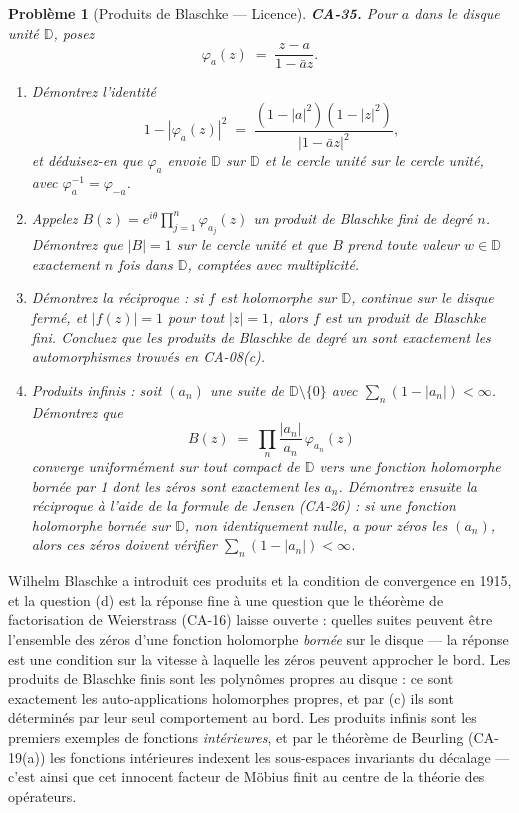 \documentclass[11pt]{article}
\newtheorem{problem}{Problème}
\begin{document}
\bigskip

\begin{problem}[{Produits de Blaschke --- Licence}]
\textbf{CA-35.} Pour $ a $ dans le disque unité $ \mathbb{D} $, posez
\[ \varphi_a(z) \;=\; \frac{z - a}{1 - \bar{a}z} . \]
\begin{enumerate}
\item[(a)] Démontrez l'identité
\[ 1 - |\varphi_a(z)|^2 \;=\; \frac{(1 - |a|^2)(1 - |z|^2)}{|1 - \bar{a}z|^2} , \]
et déduisez-en que $ \varphi_a $ envoie $ \mathbb{D} $ sur $ \mathbb{D} $ et le cercle unité
sur le cercle unité, avec $ \varphi_a^{-1} = \varphi_{-a} $.
\item[(b)] Appelez $ B(z) = e^{i\theta} \prod_{j=1}^{n} \varphi_{a_j}(z) $ un \textit{produit de Blaschke fini}
de degré $ n $. Démontrez que $ |B| = 1 $ sur le cercle unité et que $ B $ prend toute valeur
$ w \in \mathbb{D} $ exactement $ n $ fois dans $ \mathbb{D} $, comptées avec
multiplicité.
\item[(c)] Démontrez la réciproque : si $ f $ est holomorphe sur $ \mathbb{D} $, continue sur le disque
fermé, et $ |f(z)| = 1 $ pour tout $ |z| = 1 $, alors $ f $ est un produit de Blaschke fini.
Concluez que les produits de Blaschke de degré un sont exactement les automorphismes trouvés en
CA-08(c).
\item[(d)] Produits infinis : soit $ (a_n) $ une suite de $ \mathbb{D} \setminus \{0\} $ avec
$ \sum_n (1 - |a_n|) < \infty $. Démontrez que
\[ B(z) \;=\; \prod_{n} \frac{|a_n|}{a_n}\, \varphi_{a_n}(z) \]
converge uniformément sur tout compact de $ \mathbb{D} $ vers une fonction holomorphe bornée par 1
dont les zéros sont exactement les $ a_n $. Démontrez ensuite la réciproque à l'aide de la formule
de Jensen (CA-26) : si une fonction holomorphe bornée sur $ \mathbb{D} $, non identiquement nulle,
a pour zéros les $ (a_n) $, alors ces zéros doivent vérifier
$ \sum_n (1 - |a_n|) < \infty $.
\end{enumerate}

\end{problem}

\noindent Wilhelm Blaschke a introduit ces produits et la condition de convergence en 1915,
et la question (d) est la réponse fine à une question que le théorème de factorisation de
Weierstrass (CA-16) laisse ouverte : quelles suites peuvent être l'ensemble des zéros d'une fonction
holomorphe \textit{bornée} sur le disque --- la réponse est une condition sur la vitesse à laquelle les
zéros peuvent approcher le bord. Les produits de Blaschke finis sont les polynômes propres au
disque : ce sont exactement les auto-applications holomorphes propres, et par (c) ils sont
déterminés par leur seul comportement au bord. Les produits infinis sont les premiers exemples de
fonctions \textit{intérieures}, et par le théorème de Beurling (CA-19(a)) les fonctions intérieures
indexent les sous-espaces invariants du décalage --- c'est ainsi que cet innocent facteur de Möbius
finit au centre de la théorie des opérateurs.
\end{document}
